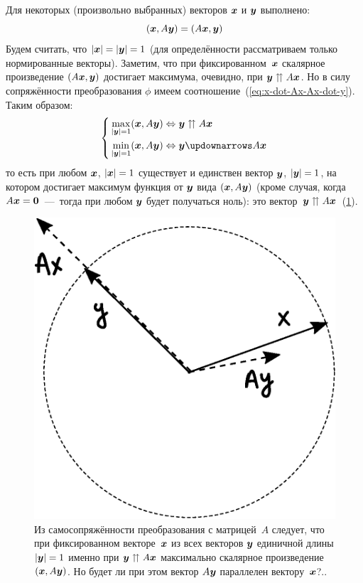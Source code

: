 \documentclass[a4paper,12pt]{article}
\theoremstyle{remark}
\begin{document}
  Для некоторых (произвольно выбранных) векторов $\boldsymbol x$ и $\boldsymbol y$ выполнено:
  \begin{equation}\label{eq:x-dot-Ax-Ax-dot-y}
    (\boldsymbol x, A \boldsymbol y) = (A \boldsymbol x, \boldsymbol y)
  \end{equation}
  Будем считать, что $|\bds x| \hm= |\bds y| \hm= 1$ (для определённости рассматриваем только нормированные векторы).
  Заметим, что при фиксированном~$\boldsymbol x$ скалярное произведение $(A \boldsymbol x, \boldsymbol y)$ достигает максимума, очевидно, при $\bds y \hm\upuparrows A \bds x$.
  Но в силу сопряжённости преобразования $\phi$ имеем соотношение~(\ref{eq:x-dot-Ax-Ax-dot-y}).
  Таким образом:
  \begin{equation}\label{eq:min-max-scalar}
    \left\{
      \begin{aligned}
        &\max_{|\bds y| = 1} (\bds x, A \bds y) \Leftrightarrow \bds y \upuparrows A \bds x\\
        &\min_{|\bds y| = 1} (\bds x, A \bds y) \Leftrightarrow \bds y \updownarrows A \bds x
      \end{aligned}
    \right.
  \end{equation}
  то есть при любом $\boldsymbol x$, $|\bds x| \hm= 1$ существует и единствен вектор $\boldsymbol y$, $|\bds y| \hm= 1$, на котором достигает максимум функция от $\boldsymbol y$ вида $(\boldsymbol x, A \boldsymbol y)$ (кроме случая, когда $A \bds x \hm= \bds 0$~---~тогда при любом $\boldsymbol y$ будет получаться ноль): это вектор~$\bds y \hm\upuparrows A \bds x$~(\ref{fig:self-adjo-on-the-way-to-understand}).
  
  \begin{figure}
    \centering
    
    \includegraphics[width=0.4\columnwidth]{self-adjo-on-the-way-to-understand}
    
    \caption{Из самосопряжённости преобразования с матрицей~$A$ следует, что при фиксированном векторе~$\boldsymbol x$ из всех векторов $\boldsymbol y$ единичной длины $|\bds y| \hm= 1$ именно при $\bds y \hm\upuparrows A \bds x$ максимально скалярное произведение $(\boldsymbol x, A \boldsymbol y)$. Но будет ли при этом вектор $A \boldsymbol y$ параллелен вектору~$\boldsymbol x$?..}
    \label{fig:self-adjo-on-the-way-to-understand}
  \end{figure}
  
\end{document}
